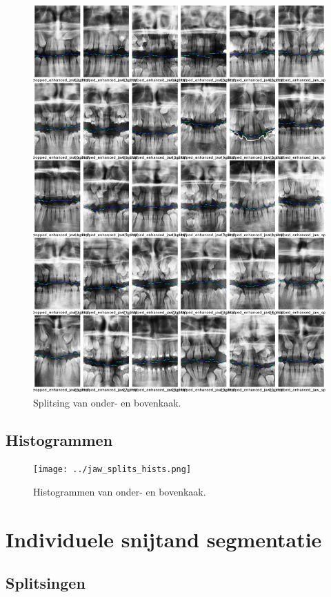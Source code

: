 \documentclass[10pt,a4paper]{article}
\begin{document}
\begin{figure}[H]
\centering
\includegraphics[width=.9\linewidth]{../jaw_splits.png}
\caption{Splitsing van onder- en bovenkaak.}
\label{fig:jaw-splits}
\end{figure}

\subsection{Histogrammen}

\begin{figure}[H]
\centering
\texttt{[image: ../jaw\_splits\_hists.png]}
\caption{Histogrammen van onder- en bovenkaak.}
\label{fig:jaw-splits-hists}
\end{figure}

\section{Individuele snijtand segmentatie}
\label{appendix:teeth-segmentation}

\subsection{Splitsingen}
\label{appendix:teeth-isolation}
\end{document}
